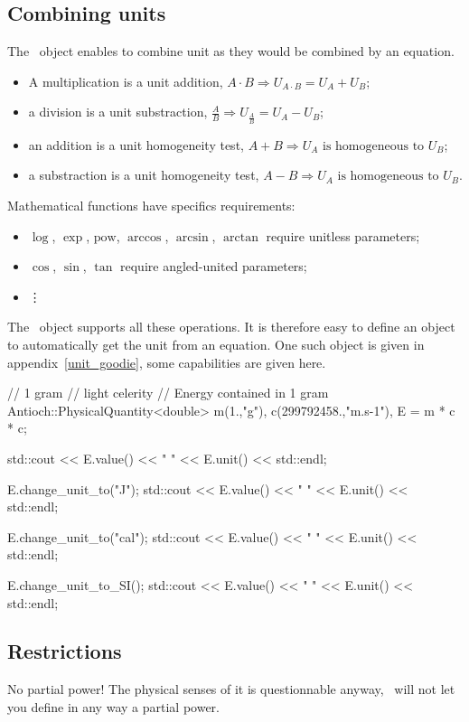 \subsection{Combining units}

The \Units\ object enables to combine unit
as they would be combined by an equation.
\begin{itemize}
\item A multiplication is a unit addition, 
        $A \cdot B \Rightarrow \unit{U_{A\cdot B}} = \unit{U_A} + \unit{U_B}$;
\item a division       is a unit substraction, 
        $\frac{A}{B} \Rightarrow \unit{U_{\frac{A}{B}}} = \unit{U_A} - \unit{U_B}$;
\item an addition      is a unit homogeneity test, 
        $A + B \Rightarrow \unit{U_A} \text{ is homogeneous to } \unit{U_B}$;
\item a substraction   is a unit homogeneity test, 
        $A - B \Rightarrow \unit{U_A} \text{ is homogeneous to } \unit{U_B}$.
\end{itemize}
Mathematical functions have specifics requirements:
\begin{itemize}
\item $\log$, $\exp$, $\mathrm{pow}$, $\arccos$, $\arcsin$, $\arctan$ require unitless parameters;
\item $\cos$, $\sin$, $\tan$ require angled-united parameters;
\item \mbox{\vdots}
\end{itemize}

The \Units\ object supports all these operations.
It is therefore easy to define an object to automatically get the unit
from an equation. One such object is given in appendix~\ref{unit_goodie},
some capabilities are given here.


\begin{minipage}{0.55\linewidth}
\begin{cpp|} 
// 1 gram 
// light celerity
// Energy contained in 1 gram
Antioch::PhysicalQuantity<double> 
        m(1.,"g"),
        c(299792458.,"m.s-1"),
        E = m * c * c; 

std::cout << E.value() << " " 
          << E.unit() << std::endl;

E.change_unit_to("J");
std::cout << E.value() << " " 
          << E.unit() << std::endl;

E.change_unit_to("cal");
std::cout << E.value() << " " 
          << E.unit() << std::endl;

E.change_unit_to_SI();
std::cout << E.value() << " " 
          << E.unit() << std::endl;
\end{cpp|}
\end{minipage}

\subsection{Restrictions}
No partial power! The physical senses of it is questionnable
anyway, \Antioch\ will not let you define in any way
a partial power.
